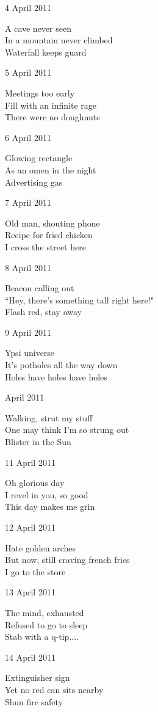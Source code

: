 \documentclass[12pt]{article}
\begin{document}
4 April 2011

A cave never seen \\
In a mountain never climbed \\
Waterfall keeps guard

5 April 2011

Meetings too early \\
Fill with an infinite rage \\
There were no doughnuts

6 April 2011

Glowing rectangle \\
As an omen in the night \\
Advertising gas

7 April 2011

Old man, shouting phone \\
Recipe for fried chicken \\
I cross the street here

8 April 2011

Beacon calling out \\
``Hey, there's something tall right here!" \\
Flash red, stay away

9 April 2011

Ypsi universe \\
It's potholes all the way down \\
Holes have holes have holes

 April 2011

Walking, strut my stuff \\
One may think I'm so strung out \\
Blister in the Sun

11 April 2011

Oh glorious day \\
I revel in you, so good \\
This day makes me grin   

12 April 2011

Hate golden arches \\
But now, still craving french fries \\
I go to the store

13 April 2011

The mind, exhausted \\
Refused to go to sleep \\
Stab with a q-tip....

14 April 2011

Extinguisher sign \\
Yet no red can sits nearby \\
Shun fire safety
\end{document}
